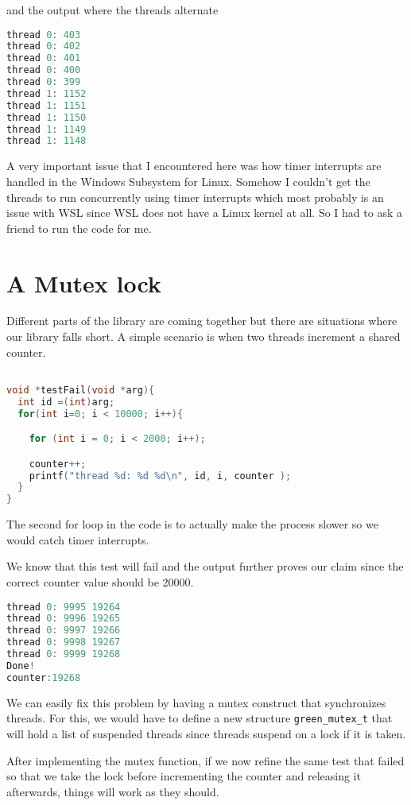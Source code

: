 \documentclass[a4paper,10pt]{article}
\begin{document}
and the output where the threads alternate
\begin{lstlisting}[language=C]
thread 0: 403
thread 0: 402
thread 0: 401
thread 0: 400
thread 0: 399
thread 1: 1152
thread 1: 1151
thread 1: 1150
thread 1: 1149
thread 1: 1148
\end{lstlisting}

A very important issue that I encountered here was how timer interrupts are handled in the Windows Subsystem for Linux. Somehow I couldn't get the threads to run concurrently using timer interrupts which most probably is an issue with WSL since WSL does not have a Linux kernel at all. So I had to ask a friend to run the code for me.

\section*{A Mutex lock}
Different parts of the library are coming together but there are situations where our library falls short. A simple scenario is when two threads increment a shared counter.

\begin{lstlisting}[language=C]

void *testFail(void *arg){
  int id =(int)arg;
  for(int i=0; i < 10000; i++){

    for (int i = 0; i < 2000; i++);

    counter++;
    printf("thread %d: %d %d\n", id, i, counter );
  }
}

\end{lstlisting}
The second for loop in the code is to actually make the process slower so we would catch timer interrupts.

We know that this test will fail and the output further proves our claim since the correct counter value should be 20000.

\begin{lstlisting}[language=C]
thread 0: 9995 19264
thread 0: 9996 19265
thread 0: 9997 19266
thread 0: 9998 19267
thread 0: 9999 19268
Done!
counter:19268
\end{lstlisting}

We can easily fix this problem by having a mutex construct that synchronizes threads. For this, we would have to define a new structure \texttt{green\_mutex\_t} that will hold a list of suspended threads since threads suspend on a lock if it is taken.

After implementing the mutex function, if we now refine the same test that failed so that we take the lock before incrementing the counter and releasing it afterwards, things will work as they should.
\end{document}

